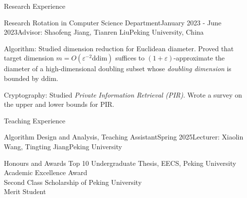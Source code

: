 \documentclass{resume} %
\begin{document}
\begin{rSection}{Research Experience}{}
    \begin{rSubsection}{Research Rotation in Computer Science Department}{January 2023 - June 2023}{Advisor: Shaofeng Jiang, Tianren Liu}{Peking University, China}
        \item Algorithm: Studied dimension reduction for Euclidean diameter. 
        Proved that target dimension $m = O(\varepsilon^{-2} \mathrm{ddim})$ suffices to $(1+\varepsilon)$-approximate the diameter of a high-dimensional doubling subset whose \emph{doubling dimension} is bounded by $\mathrm{ddim}$.
        \item Cryptography: Studied \emph{Private Information Retrieval (PIR)}.
        Wrote a survey on the upper and lower bounds for PIR.
    \end{rSubsection}
\end{rSection}

\begin{rSection}{Teaching Experience}{}
    \begin{teachSubsection}{Algorithm Design and Analysis, Teaching Assistant}{Spring 2025}{Lecturer: Xiaolin Wang, Tingting Jiang}{Peking University}
    \end{teachSubsection}
\end{rSection}

\begin{rSection}{Honours and Awards}{}
    Top 10 Undergraduate Thesis, EECS, Peking University 
    \\ Academic Excellence Award 
    \\ Second Class Scholarship of Peking University 
    \\ Merit Student 
\end{rSection}
\end{document}
